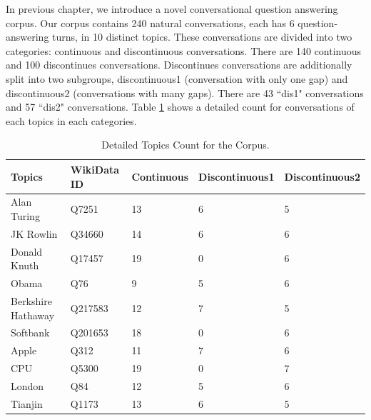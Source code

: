 \documentclass[bsc,frontabs,twoside,singlespacing,parskip,deptreport]{infthesis}     %
\begin{document}
In previous chapter, we introduce a novel conversational question answering corpus. Our corpus contains 240 natural conversations, each has 6 question-answering turns, in 10 distinct topics. These conversations are divided into two categories: continuous and discontinuous conversations. There are 140 continuous and 100 discontinues conversations. Discontinues conversations are additionally split into two subgroups, discontinuous1 (conversation with only one gap) and discontinuous2 (conversations with many gaps). There are 43 ``dis1" conversations and 57 ``dis2" conversations. Table \ref{tab:topiccount} shows a detailed count for conversations of each topics in each categories.

\begin{table}[]
\begin{tabular}{|l|l|l|l|l|}
\hline
Topics             & WikiData ID & Continuous & Discontinuous1 & Discontinuous2 \\ \hline
Alan Turing        & Q7251       & 13         & 6              & 5              \\ \hline
JK Rowlin          & Q34660      & 14         & 6              & 6              \\ \hline
Donald Knuth       & Q17457      & 19         & 0              & 6              \\ \hline
Obama              & Q76         & 9          & 5              & 6              \\ \hline
Berkshire Hathaway & Q217583     & 12         & 7              & 5              \\ \hline
Softbank           & Q201653     & 18         & 0              & 6              \\ \hline
Apple              & Q312        & 11         & 7              & 6              \\ \hline
CPU                & Q5300       & 19         & 0              & 7              \\ \hline
London             & Q84         & 12         & 5              & 6              \\ \hline
Tianjin            & Q1173       & 13         & 6              & 5              \\ \hline
\end{tabular}
\caption{Detailed Topics Count for the Corpus.}
\label{tab:topiccount}
\end{table}
\end{document}

